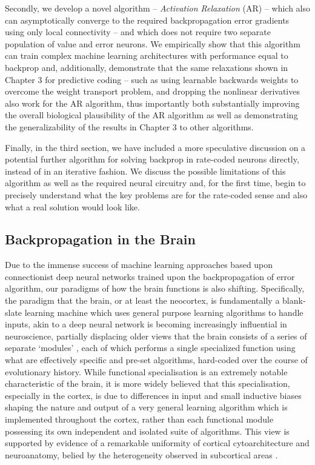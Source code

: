 Secondly, we develop a novel algorithm -- \emph{Activation Relaxation} (AR) -- which also can asymptotically converge to the required backpropagation error gradients using only local connectivity -- and which does not require two separate population of value and error neurons. We empirically show that this algorithm can train complex machine learning architectures with performance equal to backprop and, additionally, demonstrate that the same relaxations shown in Chapter 3 for predictive coding -- such as using learnable backwards weights to overcome the weight transport problem, and dropping the nonlinear derivatives also work for the AR algorithm, thus importantly both substantially improving the overall biological plausibility of the AR algorithm as well as demonstrating the generalizability of the results in Chapter 3 to other algorithms.

Finally, in the third section, we have included a more speculative discussion on a potential further algorithm for solving backprop in rate-coded neurons directly, instead of in an iterative fashion. We discuss the possible limitations of this algorithm as well as the required neural circuitry and, for the first time, begin to precisely understand what the key problems are for the rate-coded sense and also what a real solution would look like.

\subsection{Backpropagation in the Brain}

Due to the immense success of machine learning approaches based upon connectionist deep neural networks trained upon the backpropagation of error algorithm, our paradigms of how the brain functions is also shifting. Specifically, the paradigm that the brain, or at least the neocortex, is fundamentally a blank-slate learning machine which uses general purpose learning algorithms to handle inputs, akin to a deep neural network is becoming increasingly influential in neuroscience, partially displacing older views that the brain consists of a series of separate `modules' \citep{fodor1983modularity,pinker2003language}, each of which performs a single specialized function using what are effectively specific and pre-set algorithms, hard-coded over the course of evolutionary history. While functional specialisation is an extremely notable characteristic of the brain, it is more widely believed that this specialisation, especially in the cortex, is due to differences in input and small inductive biases shaping the nature and output of a very general learning algorithm which is implemented throughout the cortex, rather than each functional module possessing its own independent and isolated suite of algorithms. This view is supported by evidence of a remarkable uniformity of cortical cytoarchitecture and neuroanatomy, belied by the heterogeneity observed in subcortical areas \citep{bear2020neuroscience}.


